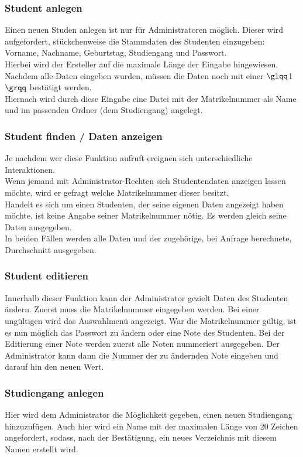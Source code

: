 \documentclass{scrartcl}
\begin{document}
		\subsubsection{Student anlegen}
			Einen neuen Studen anlegen ist nur für Administratoren möglich. Dieser wird aufgefordert, stückchenweise die Stammdaten des Studenten einzugeben: Vorname, Nachname, Geburtstag, Studiengang und Passwort.\\
			Hierbei wird der Ersteller auf die maximale Länge der Eingabe hingewiesen. Nachdem alle Daten eingeben wurden, müssen die Daten noch mit einer $\glqq$1$\grqq$ bestätigt werden.\\
			Hiernach wird durch diese Eingabe  eine Datei mit der Matrikelnummer als Name und im passenden Ordner (dem Studiengang) angelegt.
		\subsubsection{Student finden / Daten anzeigen}
			Je nachdem wer diese Funktion aufruft ereignen sich unterschiedliche Interaktionen. \\
			Wenn jemand mit Administrator-Rechten sich Studentendaten anzeigen lassen möchte, wird er gefragt welche Matrikelnummer dieser besitzt.\\
			Handelt es sich um einen Studenten, der seine eigenen Daten angezeigt haben möchte, ist keine Angabe seiner Matrikelnummer nötig. Es werden gleich seine Daten ausgegeben.\\
			In beiden Fällen werden alle Daten und der zugehörige, bei Anfrage berechnete, Durchschnitt ausgegeben.
		\subsubsection{Student editieren}
			Innerhalb dieser Funktion kann der Administrator gezielt Daten des Studenten ändern. Zuerst muss die Matrikelnummer eingegeben werden. Bei einer ungültigen wird das Auswahlmenü angezeigt. War die Matrikelnummer gültig, ist es nun möglich das Passwort zu ändern oder eine Note des Studenten. Bei der Editierung einer Note werden zuerst alle Noten nummeriert ausgegeben. Der Administrator kann dann die Nummer der zu ändernden Note eingeben und darauf hin den neuen Wert. 
		\subsubsection{Studiengang anlegen}
			Hier wird dem Administrator die Möglichkeit gegeben, einen neuen Studiengang hinzuzufügen. Auch hier wird ein Name mit der maximalen Länge von 20 Zeichen angefordert, sodass, nach der Bestätigung, ein neues Verzeichnis mit diesem Namen erstellt wird.
\end{document}
